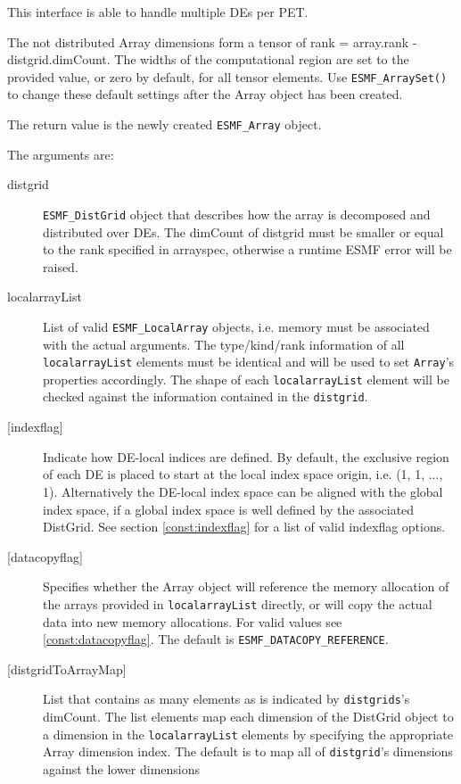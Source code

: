    This interface is able to handle multiple DEs per PET.
  
   The not distributed Array dimensions form a tensor of rank = array.rank -
   distgrid.dimCount. The widths of the computational region are set to
   the provided value, or zero by default, for all tensor elements. Use
   {\tt ESMF\_ArraySet()} to change these default settings after the
   Array object has been created.
  
   The return value is the newly created {\tt ESMF\_Array} object.
  
   The arguments are:
   \begin{description}
   \item[distgrid]
   {\tt ESMF\_DistGrid} object that describes how the array is decomposed and
   distributed over DEs. The dimCount of distgrid must be smaller or equal
   to the rank specified in arrayspec, otherwise a runtime ESMF error will be
   raised.
   \item[localarrayList]
   List of valid {\tt ESMF\_LocalArray} objects, i.e. memory must be
   associated with the actual arguments. The type/kind/rank information of
   all {\tt localarrayList} elements must be identical and will
   be used to set {\tt Array}'s properties accordingly. The shape of each
   {\tt localarrayList} element will be checked against the information
   contained in the {\tt distgrid}.
   \item[{[indexflag]}]
   Indicate how DE-local indices are defined. By default, the exclusive
   region of each DE is placed to start at the local index space origin,
   i.e. (1, 1, ..., 1). Alternatively the DE-local index space can be
   aligned with the global index space, if a global index space is well
   defined by the associated DistGrid. See section \ref{const:indexflag}
   for a list of valid indexflag options.
   \item[{[datacopyflag]}]
   Specifies whether the Array object will reference the memory allocation
   of the arrays provided in {\tt localarrayList} directly, or will copy
   the actual data into new memory allocations. For valid values see
   \ref{const:datacopyflag}. The default is {\tt ESMF\_DATACOPY\_REFERENCE}.
   \item[{[distgridToArrayMap]}]
   List that contains as many elements as is indicated by
   {\tt distgrids}'s dimCount. The list elements map each dimension of
   the DistGrid object to a dimension in the {\tt localarrayList} elements
   by specifying the appropriate Array dimension index. The default is
   to map all of {\tt distgrid}'s dimensions against the lower dimensions

\end{description}
